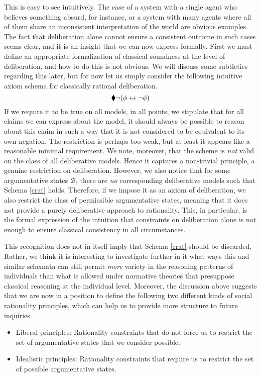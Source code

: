 \documentclass[greybox]{svmult}
\newcommand{\views}{\mathcal B}
\begin{document}
This is easy to see intuitively. The case of a system with a single agent who believes something absurd, for instance, or a system with many agents where all of them share an inconsistent interpretation of the world are obvious examples. The fact that deliberation alone cannot ensure a consistent outcome in such cases seems clear, and it is an insight that we can now express formally. First we must define an appropriate formalization of classical soundness at the level of deliberation, and how to do this is not obvious. We will discuss some subtleties regarding this later, but for now let us simply consider the following intuitive axiom schema for classically rational deliberation.
\begin{equation}\label{crat}
\cdia \neg (\phi \leftrightarrow \neg \phi)
\end{equation}
If we require it to be true on all models, in all points, we stipulate that for all claims we can express about the model, it should always be possible to reason about this claim in such a way that it is not considered to be equivalent to its own negation. The restriction is perhaps too weak, but at least it appears like a reasonable minimal requirement. We note, moreover, that the scheme is \emph{not} valid on the class of all deliberative models. Hence it captures a non-trivial principle, a genuine restriction on deliberation. However, we also notice that for some argumentative states $\views$, there are \emph{no} corresponding deliberative models such that Schema \ref{crat} holds. Therefore, if we impose it as an axiom of deliberation, we also restrict the class of permissible argumentative states, meaning that it does not provide a purely deliberative approach to rationality. This, in particular, is the formal expression of the intuition that constraints on deliberation alone is not enough to ensure classical consistency in all circumstances.

This recognition does not in itself imply that Schema \ref{crat} should be discarded. Rather, we think it is interesting to investigate further in it what ways this and similar schemata can still permit \emph{more} variety in the reasoning patterns of individuals than what is allowed under normative theories that presuppose classical reasoning at the individual level. Moreover, the discussion above suggests that we are now in a position to define the following two different kinds of social rationality principles, which can help us to provide more structure to future inquiries.

\begin{itemize}
\item Liberal principles: Rationality constraints that do not force us to restrict the set of argumentative states that we consider possible. 
\item Idealistic principles: Rationality constraints that require us to restrict the set of possible argumentative states.
\end{itemize} 
\end{document}
